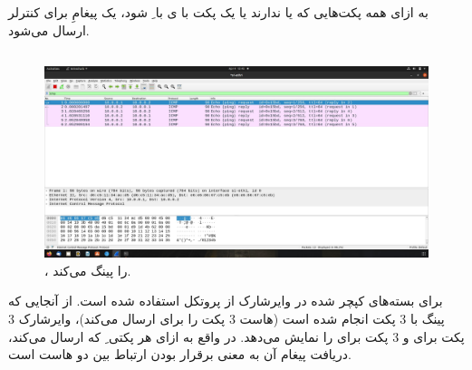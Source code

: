 \documentclass{article}
\begin{document}
\subsection{}
به ازای همه پکت‌هایی که یا  ندارند یا یک پکت با ی با ِ   شود، یک پیغامِ  برای کنترلر ارسال می‌شود.

\subsection{}
\begin{figure}[H]
    \centering
    \includegraphics[width=1.0\textwidth]{figures/1g.jpg}
    \caption
	{
،  را پینگ می‌کند.
	}
    \label{fig:fig1}
\end{figure}
برای بسته‌های کپچر شده در وایرشارک از پروتکل  استفاده شده است. از آنجایی که پینگ با 3 پکت انجام شده است (هاست  3 پکت را برای  ارسال می‌کند)، وایرشارک 3 پکت برای  و 3 پکت برای  را نمایش می‌دهد. در واقع به ازای هر پکتی ِ که  ارسال می‌کند، دریافت پیغام  آن به معنی برقرار بودن ارتباط بین دو هاست است.
\end{document}
